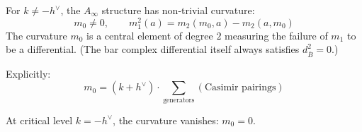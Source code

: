 \begin{theorem}\label{thm:w-bar-curvature}
For $k \neq -h^\vee$, the $A_\infty$ structure has non-trivial curvature:
\begin{equation}
m_0 \neq 0, \qquad m_1^2(a) = m_2(m_0, a) - m_2(a, m_0)
\end{equation}
The curvature $m_0$ is a central element of degree $2$ measuring the failure of $m_1$ to be a differential. (The bar complex differential itself always satisfies $d_{\bar{B}}^2 = 0$.)

Explicitly:
\begin{equation}
m_0 = (k + h^\vee) \cdot \sum_{\text{generators}} (\text{Casimir pairings})
\end{equation}

At critical level $k = -h^\vee$, the curvature vanishes: $m_0 = 0$.
\end{theorem}

